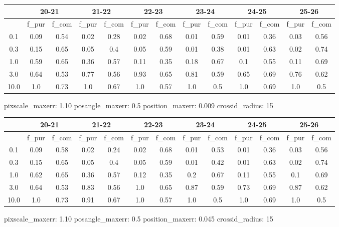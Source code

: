 \documentclass{article}
\begin{document}
\begin{figure}[H]
\centering
\begin{tabular}{|c|c|c|c|c|c|c|c|c|c|c|c|c|}
\hline
\multicolumn{1}{|c|}{} & \multicolumn{2}{|c|}{20-21} & \multicolumn{2}{|c|}{21-22} & \multicolumn{2}{|c|}{22-23} & \multicolumn{2}{|c|}{23-24} & \multicolumn{2}{|c|}{24-25} & \multicolumn{2}{|c|}{25-26}\\
\hline \hline
 & f\_pur & f\_com & f\_pur & f\_com & f\_pur & f\_com & f\_pur & f\_com & f\_pur & f\_com & f\_pur & f\_com \\
\hline
0.1 & 0.09 & 0.54 & 0.02 & 0.28 & 0.02 & 0.68 & 0.01 & 0.59 & 0.01 & 0.36 & 0.03 & 0.56\\
\hline
0.3 & 0.15 & 0.65 & 0.05 & 0.4 & 0.05 & 0.59 & 0.01 & 0.38 & 0.01 & 0.63 & 0.02 & 0.74\\
\hline
1.0 & 0.59 & 0.65 & 0.36 & 0.57 & 0.11 & 0.35 & 0.18 & 0.67 & 0.1 & 0.55 & 0.11 & 0.69\\
\hline
3.0 & 0.64 & 0.53 & 0.77 & 0.56 & 0.93 & 0.65 & 0.81 & 0.59 & 0.65 & 0.69 & 0.76 & 0.62\\
\hline
10.0 & 1.0 & 0.73 & 1.0 & 0.67 & 1.0 & 0.57 & 1.0 & 0.5 & 1.0 & 0.69 & 1.0 & 0.5\\
\hline
\end{tabular}
\caption{pixscale\_maxerr: 1.10 posangle\_maxerr: 0.5 position\_maxerr: 0.009 crossid\_radius: 15}
\end{figure}

\begin{figure}[H]
\centering
\begin{tabular}{|c|c|c|c|c|c|c|c|c|c|c|c|c|}
\hline
\multicolumn{1}{|c|}{} & \multicolumn{2}{|c|}{20-21} & \multicolumn{2}{|c|}{21-22} & \multicolumn{2}{|c|}{22-23} & \multicolumn{2}{|c|}{23-24} & \multicolumn{2}{|c|}{24-25} & \multicolumn{2}{|c|}{25-26}\\
\hline \hline
 & f\_pur & f\_com & f\_pur & f\_com & f\_pur & f\_com & f\_pur & f\_com & f\_pur & f\_com & f\_pur & f\_com \\
\hline
0.1 & 0.09 & 0.58 & 0.02 & 0.24 & 0.02 & 0.68 & 0.01 & 0.53 & 0.01 & 0.36 & 0.03 & 0.56\\
\hline
0.3 & 0.15 & 0.65 & 0.05 & 0.4 & 0.05 & 0.59 & 0.01 & 0.42 & 0.01 & 0.63 & 0.02 & 0.74\\
\hline
1.0 & 0.62 & 0.65 & 0.36 & 0.57 & 0.12 & 0.35 & 0.2 & 0.67 & 0.11 & 0.55 & 0.1 & 0.69\\
\hline
3.0 & 0.64 & 0.53 & 0.83 & 0.56 & 1.0 & 0.65 & 0.87 & 0.59 & 0.73 & 0.69 & 0.87 & 0.62\\
\hline
10.0 & 1.0 & 0.73 & 0.91 & 0.67 & 1.0 & 0.57 & 1.0 & 0.5 & 1.0 & 0.69 & 1.0 & 0.5\\
\hline
\end{tabular}
\caption{pixscale\_maxerr: 1.10 posangle\_maxerr: 0.5 position\_maxerr: 0.045 crossid\_radius: 15}
\end{figure}
\end{document}
